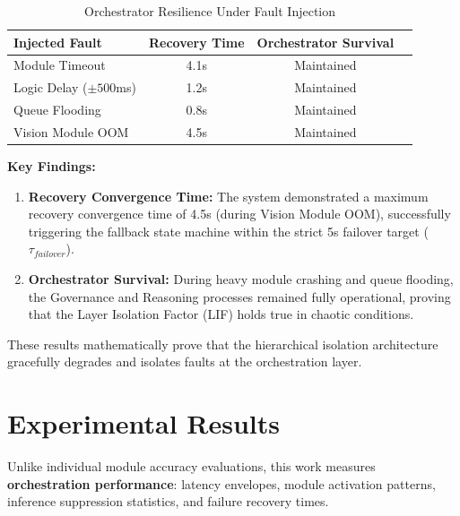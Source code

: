 \documentclass[conference]{IEEEtran}
\begin{document}
\begin{table}[htbp]
\caption{Orchestrator Resilience Under Fault Injection}
\begin{center}
\begin{tabular}{lccc}
\toprule
\textbf{Injected Fault} & \textbf{Recovery Time} & \textbf{Orchestrator Survival} \\
\midrule
Module Timeout & 4.1s & Maintained \\
Logic Delay ($\pm 500$ms) & 1.2s & Maintained \\
Queue Flooding & 0.8s & Maintained \\
Vision Module OOM & 4.5s & Maintained \\
\bottomrule
\end{tabular}
\end{center}
\end{table}

\textbf{Key Findings:}
\begin{enumerate}
    \item \textbf{Recovery Convergence Time:} The system demonstrated a maximum recovery convergence time of 4.5s (during Vision Module OOM), successfully triggering the fallback state machine within the strict 5s failover target ($\tau_{failover}$).
    \item \textbf{Orchestrator Survival:} During heavy module crashing and queue flooding, the Governance and Reasoning processes remained fully operational, proving that the Layer Isolation Factor (LIF) holds true in chaotic conditions.
\end{enumerate}
These results mathematically prove that the hierarchical isolation architecture gracefully degrades and isolates faults at the orchestration layer.

\section{Experimental Results}

Unlike individual module accuracy evaluations, this work measures \textbf{orchestration performance}: latency envelopes, module activation patterns, inference suppression statistics, and failure recovery times.

\begin{center}
\end{center}
\end{document}
